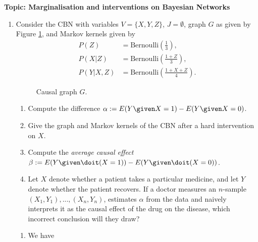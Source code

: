 

\flushleft\textbf{Topic: Marginalisation and interventions on Bayesian Networks}

\begin{enumerate}[label=7.\arabic*]
    \item \label{ex:binary_cbn} Consider the CBN with variables $V=\{X, Y, Z\}$, $J=\emptyset$, graph $G$ as given by Figure \ref{fig:one}, and Markov kernels given by
    \begin{align*}
        P(Z)      & = \mathrm{Bernoulli}\left(\frac{1}{3}\right),     \\
        P(X|Z)    & = \mathrm{Bernoulli}\left(\frac{1+Z}{3}\right),   \\
        P(Y|X, Z) & = \mathrm{Bernoulli}\left(\frac{1+X+Z}{4}\right).
    \end{align*}
    \begin{figure}[ht]
        \centering
        \caption{Causal graph $G$.}
        \label{fig:one}
    \end{figure}
    \begin{enumerate}
        \item Compute the difference $\alpha := E(Y \given X=1) - E(Y \given X=0)$.
        \item Give the graph and Markov kernels of the CBN after a hard intervention on $X$.
        \item Compute the \emph{average causal effect} $\beta := E(Y \given \doit(X=1)) - E(Y \given \doit(X=0))$.
        \item Let $X$ denote whether a patient takes a particular medicine, and let $Y$ denote whether the patient recovers. If a doctor measures an $n$-sample $(X_1, Y_1), ..., (X_n, Y_n)$, estimates $\alpha$ from the data and naively interprets it as the causal effect of the drug on the disease, which incorrect conclusion will they draw?
    \end{enumerate}
    \begin{ungradedsolution}
        \begin{enumerate}
            \item We have

\end{enumerate}
\end{ungradedsolution}
\end{enumerate}
